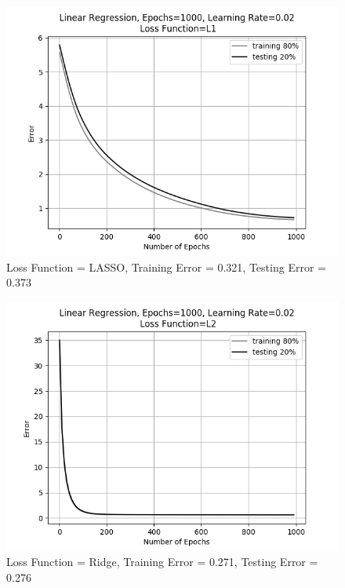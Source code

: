 \documentclass[10pt,twocolumn,letterpaper]{article}
\begin{document}
\begin{figure}[h]
	\begin{center}
		\includegraphics[width=0.9\linewidth]{img/l1loss.png}
	\end{center}
	\caption{Loss Function = LASSO, Training Error = 0.321, Testing Error = 0.373}
	\label{fig:l1loss}
\end{figure}

\begin{figure}[h]
	\begin{center}
		\includegraphics[width=0.9\linewidth]{img/l2loss.png}
	\end{center}
	\caption{Loss Function = Ridge, Training Error = 0.271, Testing Error = 0.276}
	\label{fig:l2loss}
\end{figure}
\end{document}
